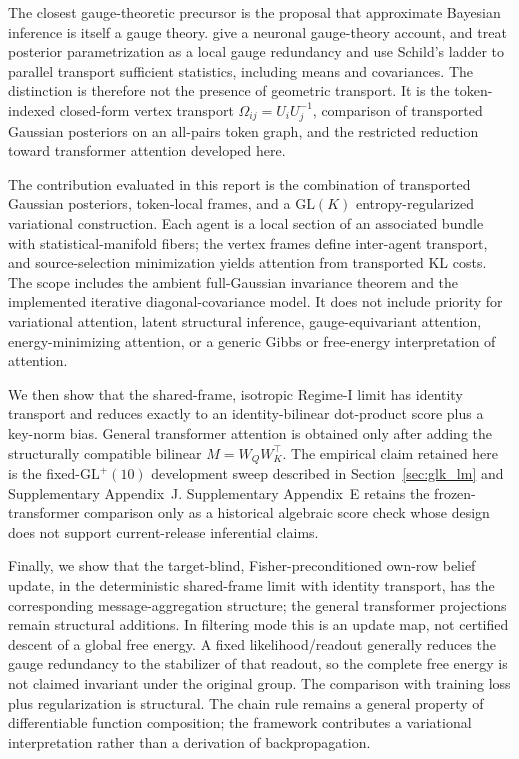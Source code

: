 \documentclass[twoside,11pt]{article}
\begin{document}
The closest gauge-theoretic precursor is the proposal that approximate Bayesian inference is itself a gauge theory. \citet{Sengupta2016NeuronalGauge} give a neuronal gauge-theory account, and \citet{sengupta2017gauge} treat posterior parametrization as a local gauge redundancy and use Schild's ladder to parallel transport sufficient statistics, including means and covariances. The distinction is therefore not the presence of geometric transport. It is the token-indexed closed-form vertex transport $\Omega_{ij}=U_iU_j^{-1}$, comparison of transported Gaussian posteriors on an all-pairs token graph, and the restricted reduction toward transformer attention developed here.

The contribution evaluated in this report is the combination of transported Gaussian posteriors, token-local frames, and a $\mathrm{GL}(K)$ entropy-regularized variational construction. Each agent is a local section of an associated bundle with statistical-manifold fibers; the vertex frames define inter-agent transport, and source-selection minimization yields attention from transported KL costs. The scope includes the ambient full-Gaussian invariance theorem and the implemented iterative diagonal-covariance model. It does not include priority for variational attention, latent structural inference, gauge-equivariant attention, energy-minimizing attention, or a generic Gibbs or free-energy interpretation of attention.

We then show that the shared-frame, isotropic Regime-I limit has identity transport and reduces exactly to an identity-bilinear dot-product score plus a key-norm bias. General transformer attention is obtained only after adding the structurally compatible bilinear $M = W_QW_K^\top$. The empirical claim retained here is the fixed-$\mathrm{GL}^+(10)$ development sweep described in Section~\ref{sec:glk_lm} and Supplementary Appendix~J. Supplementary Appendix~E retains the frozen-transformer comparison only as a historical algebraic score check whose design does not support current-release inferential claims.

Finally, we show that the target-blind, Fisher-preconditioned own-row belief update, in the deterministic shared-frame limit with identity transport, has the corresponding message-aggregation structure; the general transformer projections remain structural additions. In filtering mode this is an update map, not certified descent of a global free energy. A fixed likelihood/readout generally reduces the gauge redundancy to the stabilizer of that readout, so the complete free energy is not claimed invariant under the original group. The comparison with training loss plus regularization is structural. The chain rule remains a general property of differentiable function composition; the framework contributes a variational interpretation rather than a derivation of backpropagation.
\end{document}

